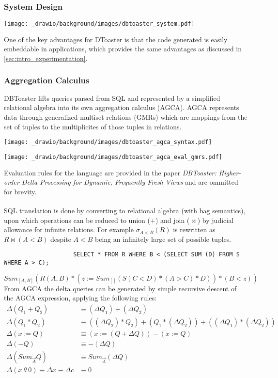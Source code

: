 \subsubsection{System Design}
\begin{center}
    \texttt{[image: \_drawio/background/images/dbtoaster\_system.pdf]}
\end{center}
One of the key advantages for DToaster is that the code generated is easily embeddable in applications, which provides the same advantages as discussed in \ref{sec:intro_experimentation}.

\subsubsection{Aggregation Calculus}
DBToaster lifts queries parsed from SQL and represented by a simplified relational algebra into its own aggregation calculus (AGCA). AGCA represents data through generalized multiset relations (GMRs) which are mappings from the set of tuples to the multiplicites of those tuples in relations.
\begin{center}
    \texttt{[image: \_drawio/background/images/dbtoaster\_agca\_syntax.pdf]}
\end{center}
\begin{center}
    \texttt{[image: \_drawio/background/images/dbtoaster\_agca\_eval\_gmrs.pdf]}
\end{center}
Evaluation rules for the language are provided in the paper \textit{DBToaster: Higher-order Delta Processing for Dynamic, Frequently Fresh Views}\cite{DBToasterHigherOrderDeltaProcessing} and are ommitted for brevity.
\\
\\ SQL translation is done by converting to relational algebra (with bag semantics), upon which operations can be reduced to union ($+$) and join ($\bowtie$) by judicial allowance for infinite relations. For example $\sigma_{A<B}(R)$ is rewritten as $R \bowtie (A < B)$ despite $A < B$ being an infinitely large set of possible tuples.
\begin{verbatim}
                    SELECT * FROM R WHERE B < (SELECT SUM (D) FROM S WHERE A > C);
\end{verbatim}
\[Sum_{[A,B]}(R(A,B) \ast (z := Sum_{[]}(S(C<D) \ast (A > C) \ast D)) \ast (B < z))\]
From AGCA the delta queries can be generated by simple recursive descent of the AGCA expression, applying the following rules:
\[
    \begin{split}
        \Delta(Q_1 + Q_2) & \equiv (\Delta Q_1) + (\Delta Q_2) \\
        \Delta(Q_1 \ast Q_2) & \equiv ((\Delta Q_2) \ast Q_2) + (Q_1 \ast (\Delta Q_2)) + ((\Delta Q_1) \ast (\Delta Q_2)) \\
        \Delta (x := Q) & \equiv (x := (Q + \Delta Q)) - (x := Q) \\
        \Delta (-Q) & \equiv - (\Delta Q) \\
        \Delta(Sum_{\overrightarrow{A}}Q) & \equiv Sum_{\overrightarrow{A}}(\Delta Q) \\
        \Delta ( x \ \theta \ 0) \equiv \Delta x \equiv \Delta c & \equiv 0 \\
    \end{split}
\]
